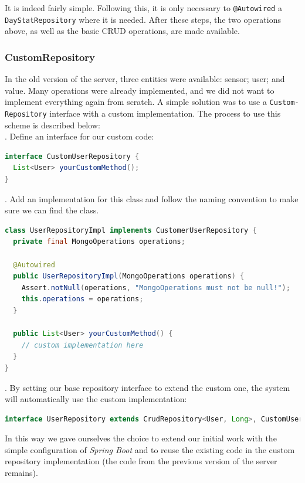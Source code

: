 \documentclass[a4paper, oneside, 11pt]{book}
\begin{document}
It is indeed fairly simple. Following this, it is only necessary to \texttt{@Autowired} a \texttt{DayStatRepository} where it is needed. After these steps, the two operations above, as well as the basic CRUD operations, are made available.

\subsubsection{CustomRepository}
In the old version of the server, three entities were available: sensor; user; and value. Many operations were already implemented, and we did not want to implement everything again from scratch. A simple solution was to use a \texttt{Custom-} \verb!Repository! interface with a custom implementation. The process to use this scheme is described below:\\

. Define an interface for our custom code:
\begin{lstlisting}[language=Java]
interface CustomUserRepository {
  List<User> yourCustomMethod();
}
\end{lstlisting}


. Add an implementation for this class and follow the naming convention to make sure we can find the class.
\begin{lstlisting}[language=Java]
class UserRepositoryImpl implements CustomerUserRepository {
  private final MongoOperations operations;

  @Autowired
  public UserRepositoryImpl(MongoOperations operations) {
    Assert.notNull(operations, "MongoOperations must not be null!");
    this.operations = operations;
  }

  public List<User> yourCustomMethod() {
    // custom implementation here
  }
}
\end{lstlisting}

. By setting our base repository interface to extend the custom one, the system will automatically use the custom implementation:
\begin{lstlisting}[language=Java]
interface UserRepository extends CrudRepository<User, Long>, CustomUserRepository {}
\end{lstlisting}

In this way we gave ourselves the choice to extend our initial work with the simple configuration of \textit{Spring Boot} and to reuse the existing code in the custom repository implementation (the code from the previous version of the server remains). 
\end{document}
